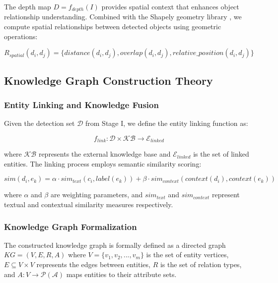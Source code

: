\documentclass[runningheads,14pt]{llncs}
\begin{document}
The depth map $D = f_{depth}(I)$ provides spatial context that enhances object relationship understanding. Combined with the Shapely geometry library \cite{gillies2007shapely}, we compute spatial relationships between detected objects using geometric operations:

\begin{equation}
R_{spatial}(d_i, d_j) = \{distance(d_i, d_j), overlap(d_i, d_j), relative\_position(d_i, d_j)\}
\end{equation}

\subsection{Knowledge Graph Construction Theory}

\subsubsection{Entity Linking and Knowledge Fusion}
Given the detection set $\mathcal{D}$ from Stage I, we define the entity linking function as:

\begin{equation}
f_{link}: \mathcal{D} \times \mathcal{KB} \rightarrow \mathcal{E}_{linked}
\end{equation}

where $\mathcal{KB}$ represents the external knowledge base and $\mathcal{E}_{linked}$ is the set of linked entities. The linking process employs semantic similarity scoring:

\begin{equation}
sim(d_i, e_k) = \alpha \cdot sim_{text}(c_i, label(e_k)) + \beta \cdot sim_{context}(context(d_i), context(e_k))
\end{equation}

where $\alpha$ and $\beta$ are weighting parameters, and $sim_{text}$ and $sim_{context}$ represent textual and contextual similarity measures respectively.

\subsubsection{Knowledge Graph Formalization}
The constructed knowledge graph is formally defined as a directed graph $KG = (V, E, R, A)$ where $V = \{v_1, v_2, ..., v_m\}$ is the set of entity vertices, $E \subseteq V \times V$ represents the edges between entities, $R$ is the set of relation types, and $A: V \rightarrow \mathcal{P}(\mathcal{A})$ maps entities to their attribute sets.
\end{document}
